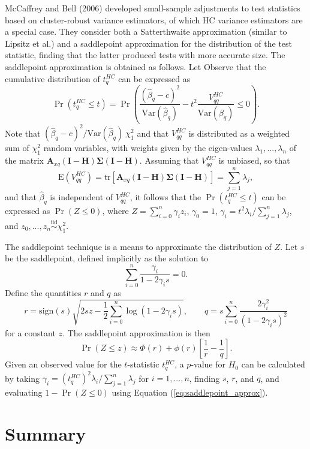 \documentclass{article}\usepackage[]{graphicx}\usepackage[]{color}
\newcommand{\E}{\text{E}}
\newcommand{\Var}{\text{Var}}
\newcommand{\tr}{\text{tr}}
\newcommand{\iid}{\stackrel{\text{iid}}{\sim}}
\newcommand{\bm}{\mathbf}
\newcommand{\bs}{\boldsymbol}
\begin{document}
McCaffrey and Bell (2006) developed small-sample adjustments to test statistics based on cluster-robust variance estimators, of which HC variance estimators are a special case. They consider both a Satterthwaite approximation (similar to Lipsitz et al.) and a saddlepoint approximation for the distribution of the test statistic, finding that the latter produced tests with more accurate size. The saddlepoint approximation is obtained as follows. Let Observe that the cumulative distribution of $t^{HC}_q$ can be expressed as \[
\Pr\left(t^{HC}_q \leq t\right) = \Pr\left(\frac{\left(\hat\beta_q - c\right)^2}{\Var(\hat\beta_q)} - t^2 \frac{V^{HC}_{qq}}{\Var(\hat\beta_q)} \leq 0\right). \]
Note that $\left(\hat\beta_q - c\right)^2 / \Var(\hat\beta_q) ~ \chi^2_1$ and that $V^{HC}_{qq}$ is distributed as a weighted sum of $\chi^2_1$ random variables, with weights given by the eigen-values $\lambda_1,...,\lambda_n$ of the matrix $\bm{A}_{xq} \left(\bm{I} - \bm{H}\right)\bs\Sigma\left(\bm{I} - \bm{H}\right)$. Assuming that $V^{HC}_{qq}$ is unbiased, so that \[
\E\left(V^{HC}_{qq}\right) = \tr\left[\bm{A}_{xq} \left(\bm{I} - \bm{H}\right)\bs\Sigma\left(\bm{I} - \bm{H}\right)\right] = \sum_{j=1}^n \lambda_j, \]
and that $\hat\beta_q$ is independent of $V^{HC}_{qq}$, it follows that the $\Pr\left(t^{HC}_q \leq t\right)$ can be expressed as $\Pr(Z \leq 0)$, where $Z = \sum_{i=0}^n \gamma_i z_i$,
$\gamma_0 = 1$, $\gamma_i = t^2 \lambda_i / \sum_{j=1}^n \lambda_j$, and $z_0,...,z_n \iid \chi^2_1$.

The saddlepoint technique is a means to approximate the distribution of $Z$. Let $s$ be the saddlepoint, defined implicitly as the solution to \[
\sum_{i=0}^n \frac{\gamma_i}{1 - 2 \gamma_i s} = 0. \]
Define the quantities $r$ and $q$ as \[
r = \text{sign}(s)\sqrt{2sz - \frac{1}{2}\sum_{i=0}^n \log\left(1 - 2\gamma_i s\right)}, \qquad q = s \sum_{i=0}^n \frac{2 \gamma_i^2}{\left(1 - 2 \gamma_i s\right)^2} \]
for a constant $z$. The saddlepoint approximation is then 
\begin{equation}
\label{eq:saddlepoint_approx}
\Pr(Z \leq z) \approx \Phi(r) + \phi(r)\left[\frac{1}{r} - \frac{1}{q}\right].
\end{equation}
Given an observed value for the $t$-statistic $t^{HC}_q$, a $p$-value for $H_0$ can be calculated by taking $\gamma_i = \left(t^{HC}_q\right)^2 \lambda_i / \sum_{j=1}^n \lambda_j$ for $i = 1,...,n$, finding $s$, $r$, and $q$, and evaluating $1 - \Pr(Z \leq 0)$ using Equation (\ref{eq:saddlepoint_approx}).

\section{Summary}
\end{document}

